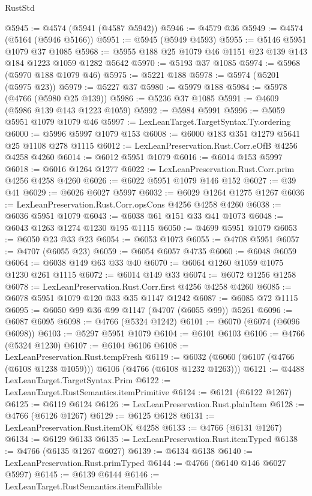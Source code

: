\begin{lexlean}{RustStd}
\begin{coremodule}
@5945 := @4574 (@5941 (@4587 @5942))
@5946 := @4579 @36
@5949 := @4574 (@5164 (@5946 @5166))
@5951 := @5945 (@5949 @4593)
@5955 := @5146 @5951 @1079 @37 @1085
@5968 := @5955 @188 @25 @1079 @46 @1151 @23 @139 @143 @184 @1223 @1059 @1282 @5642
@5970 := @5193 @37 @1085
@5974 := @5968 (@5970 @188 @1079 @46)
@5975 := @5221 @188
@5978 := @5974 (@5201 (@5975 @23))
@5979 := @5227 @37
@5980 := @5979 @188
@5984 := @5978 (@4766 (@5980 @25 @139))
@5986 := @5236 @37 @1085
@5991 := @4609 (@5986 @139 @143 @1223 @1059)
@5992 := @5984 @5991
@5996 := @5059 @5951 @1079 @1079 @46
@5997 := LexLeanTarget.TargetSyntax.Ty.ordering
@6000 := @5996 @5997 @1079 @153
@6008 := @6000 @183 @351 @1279 @5641 @25 @1108 @278 @1115
@6012 := LexLeanPreservation.Rust.Corr.eOfB @4256 @4258 @4260
@6014 := @6012 @5951 @1079
@6016 := @6014 @153 @5997
@6018 := @6016 @1264 @1277
@6022 := LexLeanPreservation.Rust.Corr.prim @4256 @4258 @4260
@6026 := @6022 @5951 @1079 @146 @152
@6027 := @39 @41
@6029 := @6026 @6027 @5997
@6032 := @6029 @1264 @1275 @1267
@6036 := LexLeanPreservation.Rust.Corr.opsCons @4256 @4258 @4260
@6038 := @6036 @5951 @1079
@6043 := @6038 @61 @151 @33 @41 @1073
@6048 := @6043 @1263 @1274 @1230 @195 @1115
@6050 := @4699 @5951 @1079
@6053 := @6050 @23 @33 @23
@6054 := @6053 @1073
@6055 := @4708 @5951
@6057 := @4707 (@6055 @23)
@6059 := @6054 @6057 @4735
@6060 := @6048 @6059
@6064 := @6038 @149 @63 @33 @40
@6070 := @6064 @1260 @1059 @1075 @1230 @261 @1115
@6072 := @6014 @149 @33
@6074 := @6072 @1256 @1258
@6078 := LexLeanPreservation.Rust.Corr.first @4256 @4258 @4260
@6085 := @6078 @5951 @1079 @120 @33 @35 @1147 @1242
@6087 := @6085 @72 @1115
@6095 := @6050 @99 @36 @99 @1147 (@4707 (@6055 @99)) @5261
@6096 := @6087 @6095
@6098 := @4766 (@5324 @1242)
@6101 := @6070 (@6074 (@6096 @6098))
@6103 := @5297 @5951 @1079
@6104 := @6101 @6103
@6106 := @4766 (@5324 @1230)
@6107 := @6104 @6106
@6108 := LexLeanPreservation.Rust.tempFresh
@6119 := @6032 (@6060 (@6107 (@4766 (@6108 @1238 @1059))) @6106 (@4766 (@6108 @1232 @1263)))
@6121 := @4488 LexLeanTarget.TargetSyntax.Prim
@6122 := LexLeanTarget.RustSemantics.itemPrimitive
@6124 := @6121 (@6122 @1267)
@6125 := @6119 @6124
@6126 := LexLeanPreservation.Rust.plainItem
@6128 := @4766 (@6126 @1267)
@6129 := @6125 @6128
@6131 := LexLeanPreservation.Rust.itemOK @4258
@6133 := @4766 (@6131 @1267)
@6134 := @6129 @6133
@6135 := LexLeanPreservation.Rust.itemTyped
@6138 := @4766 (@6135 @1267 @6027)
@6139 := @6134 @6138
@6140 := LexLeanPreservation.Rust.primTyped
@6144 := @4766 (@6140 @146 @6027 @5997)
@6145 := @6139 @6144
@6146 := LexLeanTarget.RustSemantics.itemFallible

\end{coremodule}
\end{lexlean}
